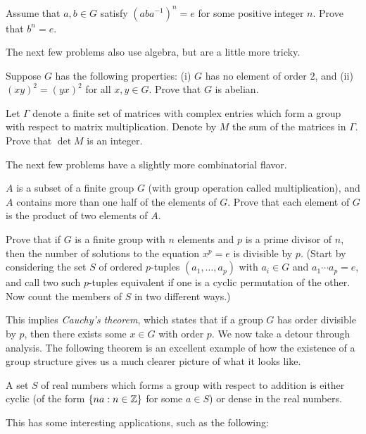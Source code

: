 \documentclass{article}
\begin{document}
\begin{exercise}
Assume that $a,b\in G$ satisfy $(a b a^{-1})^n = e$ for some positive integer $n$. Prove that $b^n = e$.
\end{exercise}

The next few problems also use algebra, but are a little more tricky.

\begin{exercise}
Suppose $G$ has the following properties: (i) $G$ has no element of order $2$, and (ii) $(xy)^2=(yx)^2$ for all $x,y\in G$. Prove that $G$ is abelian.
\end{exercise}

\begin{exercise}
Let $\Gamma$ denote a finite set of matrices with complex entries which form a group with respect to matrix multiplication. Denote by $M$ the sum of the matrices in $\Gamma$. Prove that $\det M$ is an integer.
\end{exercise}

The next few problems have a slightly more combinatorial flavor. 

\begin{exercise}[1968 B2]
$A$ is a subset of a finite group $G$ (with group operation called multiplication), and $A$ contains more than one half of the elements of $G$. Prove that each element of $G$ is the product of two elements of $A$.
\end{exercise}

\begin{exercise}
Prove that if $G$ is a finite group with $n$ elements and $p$ is a prime divisor of $n$, then the number of solutions to the equation $x^p=e$ is divisible by $p$. (Start by considering the set $S$ of ordered $p$-tuples $(a_1,\dots,a_p)$ with $a_i\in G$ and $a_1\cdots a_p=e$, and call two such $p$-tuples equivalent if one is a cyclic permutation of the other. Now count the members of $S$ in two different ways.)
\end{exercise}
This implies \emph{Cauchy's theorem}, which states that if a group $G$ has order divisible by $p$, then there exists some $x\in G$ with order $p$. We now take a detour through analysis. The following theorem is an excellent example of how the existence of a group structure gives us a much clearer picture of what it looks like.

\begin{theorem}
A set $S$ of real numbers which forms a group with respect to addition is either cyclic (of the form $\{na:n\in \mathbb{Z}\}$ for some $a\in S$) or dense in the real numbers.
\end{theorem}
\noindent This has some interesting applications, such as the following:
\end{document}
